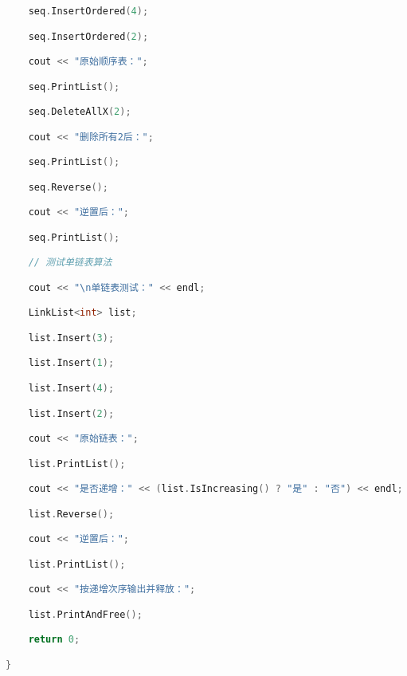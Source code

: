 \begin{lstlisting}[language=C++]
    seq.InsertOrdered(4);

    seq.InsertOrdered(2);

    cout << "原始顺序表：";

    seq.PrintList();

    seq.DeleteAllX(2);

    cout << "删除所有2后：";

    seq.PrintList();

    seq.Reverse();

    cout << "逆置后：";

    seq.PrintList();

    // 测试单链表算法

    cout << "\n单链表测试：" << endl;

    LinkList<int> list;

    list.Insert(3);

    list.Insert(1);

    list.Insert(4);

    list.Insert(2);

    cout << "原始链表：";

    list.PrintList();

    cout << "是否递增：" << (list.IsIncreasing() ? "是" : "否") << endl;

    list.Reverse();

    cout << "逆置后：";

    list.PrintList();

    cout << "按递增次序输出并释放：";

    list.PrintAndFree();

    return 0;

}
\end{lstlisting}
